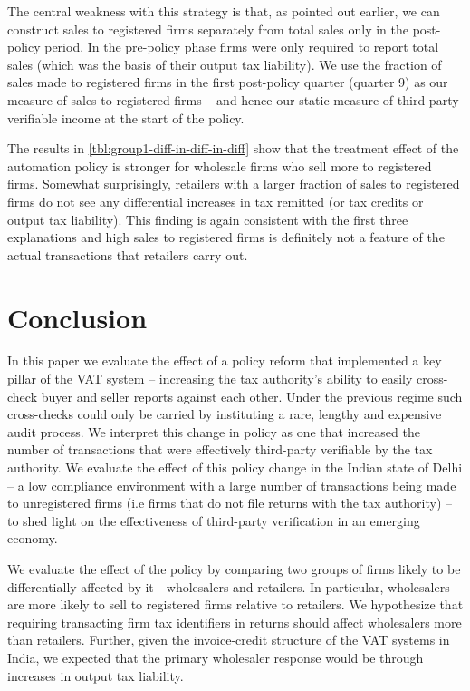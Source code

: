 \begin{table}[t!]
{\begin{threeparttable}
\begin{tablenotes}
\end{tablenotes}
\label{tbl:group1-diff-in-diff-in-diff}
\end{threeparttable}}
\end{table}

The central weakness with this strategy is that, as pointed out earlier, we can construct sales to registered firms separately from
total sales only in the post-policy period. In the pre-policy phase firms were only required to report total sales (which was the basis of their output tax liability). We use the fraction of sales made to registered firms in the first post-policy quarter (quarter 9) as our measure of sales to registered firms -- and hence our static measure of third-party verifiable income at the start of the policy. 

The results in \cref{tbl:group1-diff-in-diff-in-diff} show that the treatment effect of the automation policy is stronger for wholesale firms who sell more to registered firms. Somewhat surprisingly, retailers with a larger fraction of sales to registered firms do not see any differential increases in tax remitted (or tax credits or output tax liability). This finding is again consistent with the first three explanations and high sales to registered firms is definitely not a feature of the actual transactions that retailers carry out.

\section{Conclusion} 
\label{sec:1-conclusion} 
In this paper we evaluate the effect of a policy reform that implemented a key pillar of the VAT system -- increasing the tax authority's ability to easily cross-check buyer and seller reports against each other. Under the previous regime such cross-checks could only be carried by instituting a rare, lengthy and expensive audit process. We interpret this change in policy as one that increased the number of transactions that were effectively third-party verifiable by the tax authority. We evaluate the effect of this policy change in the Indian state of Delhi -- a low compliance environment with a large number of
transactions being made to unregistered firms (i.e firms that do not file returns with the tax authority) -- to shed light on the effectiveness of third-party verification in an emerging economy.

We evaluate the effect of the policy by comparing two groups of firms likely to be differentially affected by it - wholesalers and retailers. In particular, wholesalers are more likely to sell to registered firms relative to retailers. We hypothesize that requiring transacting firm tax identifiers in returns should affect wholesalers more than retailers.  Further, given the invoice-credit structure of the VAT systems in India, we expected that the primary wholesaler response would be through increases in output tax liability.

